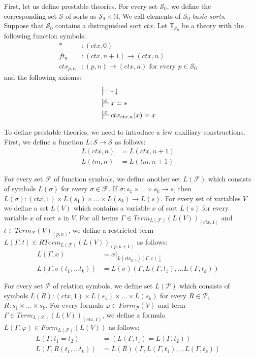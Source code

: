 \documentclass[reqno]{amsart}
\theoremstyle{definition}
\theoremstyle{remark}
\newcommand{\emptyCtx}{*}
\numberwithin{figure}{section}
\begin{document}
First, let us define prestable theories.
For every set $\mathcal{S}_0$, we define the corresponding set $\mathcal{S}$ of sorts as $\mathcal{S}_0 \times \mathbb{N}$.
We call elements of $\mathcal{S}_0$ \emph{basic sorts}.
Suppose that $\mathcal{S}_0$ contains a distinguished sort $ctx$.
Let $\mathbb{T}_{\mathcal{S}_0}$ be a theory with the following function symbols:
\begin{align*}
\emptyCtx  &: (ctx,0) \\
ft_n & : (ctx,n+1) \to (ctx,n) \\
ctx_{p,n} & : (p,n) \to (ctx,n) \text{ for every } p \in \mathcal{S}_0
\end{align*}
and the following axioms:
\begin{align*}
& \sststile{}{} \emptyCtx\!\downarrow \\
& \sststile{}{x} x = \emptyCtx \\
& \sststile{}{x} ctx_{ctx,n}(x) = x
\end{align*}

To define prestable theories, we need to introduce a few auxiliary constructions.
First, we define a function $L : \mathcal{S} \to \mathcal{S}$ as follows:
\begin{align*}
L(ctx,n) & = L(ctx,n+1) \\
L(tm,n) & = L(tm,n+1)
\end{align*}

For every set $\mathcal{F}$ of function symbols, we define another set $L(\mathcal{F})$ which consists of symbols $L(\sigma)$ for every $\sigma \in \mathcal{F}$.
If $\sigma : s_1 \times \ldots \times s_k \to s$, then $L(\sigma) : (ctx,1) \times L(s_1) \times \ldots \times L(s_k) \to L(s)$.
For every set of variables $V$ we define a set $L(V)$ which contains a variable $x$ of sort $L(s)$ for every variable $x$ of sort $s$ in $V$.
For all terms $\Gamma \in Term_{L(\mathcal{F})}(L(V))_{(ctx,1)}$ and $t \in Term_{\mathcal{F}}(V)_{(p,n)}$,
we define a restricted term $L(\Gamma,t) \in RTerm_{L(\mathcal{F})}(L(V))_{(p,n+1)}$ as follows:
\begin{align*}
L(\Gamma, x) & = x|_{L(ctx_{p,n})(\Gamma, x) \downarrow} \\
L(\Gamma, \sigma(t_1, \ldots t_k)) & = L(\sigma)(\Gamma, L(\Gamma, t_1), \ldots L(\Gamma, t_k))
\end{align*}

For every set $\mathcal{P}$ of relation symbols, we define set $L(\mathcal{P})$ which consists of symbols
    $L(R) : (ctx,1) \times L(s_1) \times \ldots \times L(s_k)$ for every $R \in \mathcal{P}$, $R : s_1 \times \ldots \times s_k$.
For every formula $\varphi \in Form_\mathcal{P}(V)$ and term $\Gamma \in Term_{L(\mathcal{F})}(L(V))_{(ctx,1)}$,
we define a formula $L(\Gamma, \varphi) \in Form_{L(\mathcal{P})}(L(V))$ as follows:
\begin{align*}
L(\Gamma, t_1 = t_2) & = (L(\Gamma, t_1) = L(\Gamma, t_2)) \\
L(\Gamma, R(t_1, \ldots t_k)) & = L(R)(\Gamma, L(\Gamma, t_1), \ldots L(\Gamma, t_k))
\end{align*}
\end{document}
